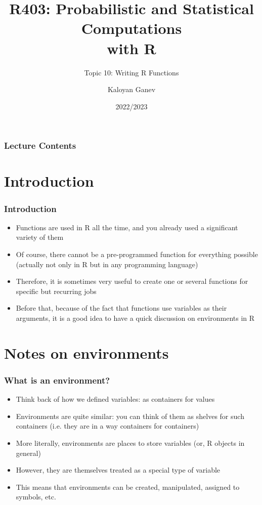 \documentclass[10pt]{beamer}
\title{R403: Probabilistic and Statistical Computations\\ with R}
\subtitle{Topic 10: \textcolor{myred}{Writing R Functions}}
\author{Kaloyan Ganev}
\date{2022/2023}
\theoremstyle{definition}
\begin{document}
\maketitle

\begin{frame}[fragile]
\frametitle{Lecture Contents}
\tableofcontents
\end{frame}
  
\section{Introduction}
\begin{frame}[fragile]
\frametitle{Introduction}
\begin{itemize}
	\item Functions are used in R all the time, and you already used a significant variety of them
	\item Of course, there cannot be a pre-programmed function for everything possible (actually not only in R but in any programming language)
	\item Therefore, it is sometimes very useful to create one or several functions for specific but recurring jobs
	\item Before that, because of the fact that functions use variables as their arguments, it is a good idea to have a quick discussion on environments in R
\end{itemize}
\end{frame}

\section{Notes on environments}
\begin{frame}[fragile]
\frametitle{What is an environment?}
\begin{itemize}
	\item Think back of how we defined variables: as containers for values
	\item Environments are quite similar: you can think of them as shelves for such containers (i.e. they are in a way containers for containers)
	\item More literally, environments are places to store variables (or, R objects in general)
	\item However, they are themselves treated as a special type of variable
	\item This means that environments can be created, manipulated, assigned to symbols, etc.
\end{itemize}
\end{frame}
\end{document}
